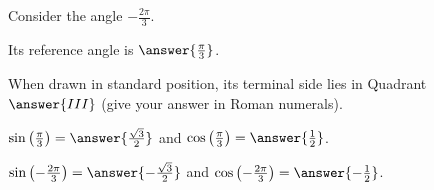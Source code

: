 \documentclass{ximera}
\author{Kenneth Berglund}
\begin{document}
\begin{exercise}
Consider the angle $-\frac{2\pi}{3}$. 

Its reference angle is $\answer{\frac{\pi}{3}}$.

When drawn in standard position, its terminal side lies in Quadrant $\answer{III}$ (give your answer in Roman numerals). 

\begin{exercise}
$\sin\left(\frac{\pi}{3}\right) = \answer{\frac{\sqrt{3}}{2}}$ and $\cos\left(\frac{\pi}{3}\right) = \answer{\frac{1}{2}}$.

\begin{exercise}
$\sin\left(-\frac{2\pi}{3}\right) = \answer{-\frac{\sqrt{3}}{2}}$ and $\cos\left(-\frac{2\pi}{3}\right) = \answer{-\frac{1}{2}}$.
\end{exercise}
\end{exercise}

\end{exercise}
\end{document}
